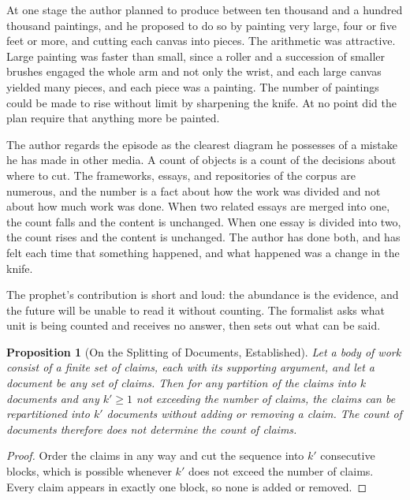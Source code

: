 \documentclass[11pt,openany,twoside]{book}
\theoremstyle{plain}
\newtheorem{proposition}{Proposition}[chapter]
\theoremstyle{definition}
\theoremstyle{remark}
\begin{document}
At one stage the author planned to produce between ten thousand and a hundred thousand paintings, and he proposed to do so by painting very large, four or five feet or more, and cutting each canvas into pieces. The arithmetic was attractive. Large painting was faster than small, since a roller and a succession of smaller brushes engaged the whole arm and not only the wrist, and each large canvas yielded many pieces, and each piece was a painting. The number of paintings could be made to rise without limit by sharpening the knife. At no point did the plan require that anything more be painted.

The author regards the episode as the clearest diagram he possesses of a mistake he has made in other media. A count of objects is a count of the decisions about where to cut. The frameworks, essays, and repositories of the corpus are numerous, and the number is a fact about how the work was divided and not about how much work was done. When two related essays are merged into one, the count falls and the content is unchanged. When one essay is divided into two, the count rises and the content is unchanged. The author has done both, and has felt each time that something happened, and what happened was a change in the knife.

The prophet's contribution is short and loud: the abundance is the evidence, and the future will be unable to read it without counting. The formalist asks what unit is being counted and receives no answer, then sets out what can be said.

\begin{proposition}[On the Splitting of Documents, Established]\label{prop:splitting}
Let a body of work consist of a finite set of claims, each with its supporting argument, and let a document be any set of claims. Then for any partition of the claims into $k$ documents and any $k'\ge 1$ not exceeding the number of claims, the claims can be repartitioned into $k'$ documents without adding or removing a claim. The count of documents therefore does not determine the count of claims.
\end{proposition}

\begin{proof}
Order the claims in any way and cut the sequence into $k'$ consecutive blocks, which is possible whenever $k'$ does not exceed the number of claims. Every claim appears in exactly one block, so none is added or removed.
\end{proof}
\end{document}
